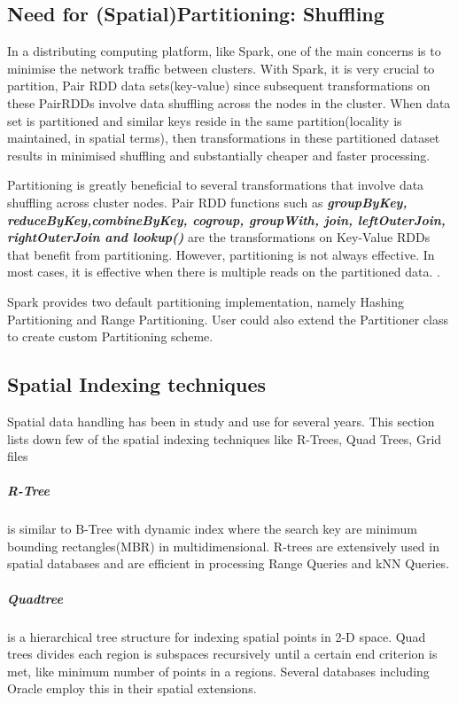 \documentclass[article,type=msc,colorback,12pt,accentcolor=tud1d]{tudthesis}
\begin{document}
		    \clearpage
		   \subsection{Need for (Spatial)Partitioning: Shuffling}
		   
		   In a distributing computing platform, like Spark, one of the main concerns is to minimise the network traffic between clusters. With Spark, it is very crucial to partition, Pair RDD\cite{sparkKV} data sets(key-value) since subsequent transformations on these PairRDDs involve data shuffling across the nodes in the cluster. When data set is partitioned and similar keys reside in the same partition(locality is maintained, in spatial terms), then transformations in these partitioned dataset results in minimised shuffling and substantially cheaper and faster processing.  
		   
		   Partitioning is greatly beneficial to several transformations that involve data shuffling across cluster nodes. Pair RDD functions\cite{sparkPairRDDFunctions} such as \textbf{\textit{groupByKey, reduceByKey,combineByKey, cogroup, groupWith, join, leftOuterJoin, rightOuterJoin and lookup()}} are the transformations on Key-Value RDDs that benefit from partitioning. However, partitioning is not always effective. In most cases, it is effective when there is multiple reads on the partitioned data. \cite{sparkbook}.
		   
		   Spark provides two default partitioning implementation, namely Hashing Partitioning and Range Partitioning. User could also extend the Partitioner class to create custom Partitioning scheme. 
		   
		   
		   \hfill
		   \subsection{Spatial Indexing techniques}
		   
		   Spatial data handling has been in study and use for several years. This section lists down few of the spatial indexing techniques like R-Trees, Quad Trees, Grid files
		   
		   \subparagraph{R-Tree} is similar to B-Tree with dynamic index where the search key are minimum bounding rectangles(MBR) in multidimensional. R-trees are extensively used in spatial databases and are efficient in processing Range Queries and kNN Queries.
		   
		   \subparagraph{Quadtree} is a hierarchical tree structure for indexing spatial points in 2-D space. Quad trees divides each region is subspaces recursively until a certain end criterion is met, like minimum number of points in a regions. Several databases including Oracle employ this in their spatial extensions.
		   
\end{document}
